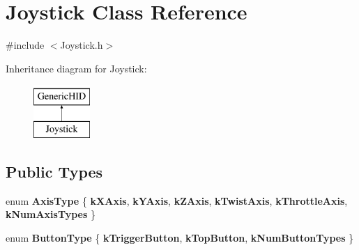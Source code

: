 \hypertarget{classJoystick}{\section{\-Joystick \-Class \-Reference}
\label{classJoystick}
}


{\ttfamily \#include $<$\-Joystick.\-h$>$}

\-Inheritance diagram for \-Joystick\-:\begin{figure}[H]
\begin{center}
\leavevmode
\includegraphics[height=2.000000cm]{classJoystick}
\end{center}
\end{figure}
\subsection*{\-Public \-Types}
\begin{DoxyCompactItemize}
\item 
enum {\bfseries \-Axis\-Type} \{ \*
{\bfseries k\-X\-Axis}, 
{\bfseries k\-Y\-Axis}, 
{\bfseries k\-Z\-Axis}, 
{\bfseries k\-Twist\-Axis}, 
\*
{\bfseries k\-Throttle\-Axis}, 
{\bfseries k\-Num\-Axis\-Types}
 \}
\item 
enum {\bfseries \-Button\-Type} \{ {\bfseries k\-Trigger\-Button}, 
{\bfseries k\-Top\-Button}, 
{\bfseries k\-Num\-Button\-Types}
 \}
\end{DoxyCompactItemize}
